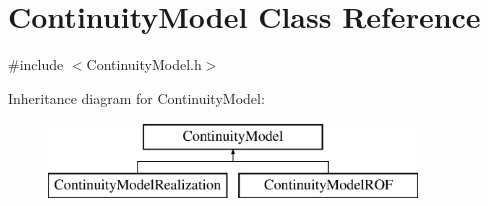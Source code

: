 \hypertarget{classContinuityModel}{}\section{Continuity\+Model Class Reference}
\label{classContinuityModel}


{\ttfamily \#include $<$Continuity\+Model.\+h$>$}

Inheritance diagram for Continuity\+Model\+:\begin{figure}[H]
\begin{center}
\leavevmode
\includegraphics[height=2.000000cm]{classContinuityModel}
\end{center}
\end{figure}
